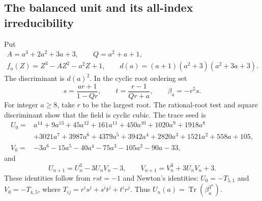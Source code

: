 \documentclass[11pt,a4paper]{article}
\theoremstyle{definition}\newtheorem{definition}[theorem]{Definition}
\theoremstyle{remark}\newtheorem{remark}[theorem]{Remark}
\begin{document}
\subsection{The balanced unit and its all-index irreducibility}
Put
\[
\begin{gathered}
A=a^3+2a^2+3a+3,\qquad Q=a^2+a+1,\\
f_a(Z)=Z^3-AZ^2-a^2Z+1,\qquad
d(a)=(a+1)(a^2+3)(a^2+3a+3).\end{gathered}
\]
The discriminant is $d(a)^2$. In the cyclic root ordering set
\[
 s=\frac{ar+1}{1-Qr},\qquad t=\frac{r-1}{Qr+a},
 \qquad\beta_a=-r^5s.
\]
For integer $a\ge8$, take $r$ to be the largest root. The rational-root
test and square discriminant show that the field is cyclic cubic.
The trace seed is
\begin{align*}
 U_0={}&a^{14}+9a^{13}+45a^{12}+161a^{11}+450a^{10}
 +1020a^9+1918a^8\\
 &+3021a^7+3987a^6+4379a^5+3942a^4+2820a^3
 +1521a^2+558a+105,\\
 V_0={}&-3a^6-15a^5-40a^4-75a^3-105a^2-90a-33,
\end{align*}
and
\begin{equation}\label{pis:fac:rec}
 U_{n+1}=U_n^3-3U_nV_n-3,\qquad
 V_{n+1}=V_n^3+3U_nV_n+3.
\end{equation}
These identities follow from $rst=-1$ and Newton's identities:
$U_0=-T_{5,1}$ and $V_0=-T_{4,5}$, where
$T_{ij}=r^is^j+s^it^j+t^ir^j$. Thus
$U_n(a)=\operatorname{Tr}(\beta_a^{3^n})$.
\end{document}
